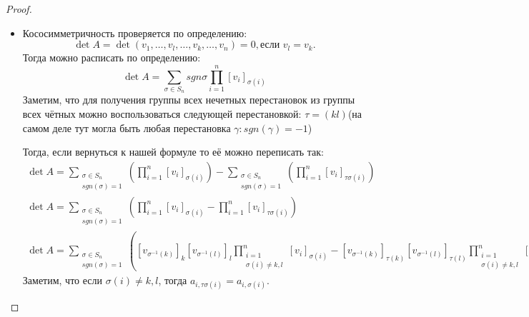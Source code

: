 \begin{proof}
\begin{enumerate}
\begin{itemize}
                \item Кососимметричность проверяется по определению:
                    \[
                    \det A = \det(v_1,\dots, v_l,\dots, v_k,\dots, v_n) = 0, \text{если } v_l = v_k.
                    \]
                    Тогда можно расписать по определению:
                    \[
                        \det A = \sum\limits_{\sigma\in S_n}^{}{sgn\sigma\prod\limits_{i=1}^{n}[v_i]_{\sigma(i)}}
                    \]
                    Заметим, что для получения группы всех нечетных перестановок из группы всех 
                    чётных можно воспользоваться следующей перестановкой: $\tau=(kl)$(на самом
                    деле тут могла быть любая перестановка $\gamma\colon sgn(\gamma) = -1$)

                    Тогда, если вернуться к нашей формуле то её можно переписать так:
                    \[
                    \begin{gathered}
                        \det A = 
                        \sum\limits_{\substack{\sigma\in S_n\\sgn(\sigma)=1}}
                        \left(\prod\limits_{i=1}^{n}[v_i]_{\sigma(i)}\right)
                            - 
                        \sum\limits_{\substack{\sigma\in S_n\\sgn(\sigma)=1}}
                        \left(\prod\limits_{i=1}^{n}[v_i]_{\tau\sigma(i)}\right)
                        \\
                        \det A = 
                        \sum\limits_{\substack{\sigma\in S_n\\sgn(\sigma)=1}}
                        \left(\prod\limits_{i=1}^{n}[v_i]_{\sigma(i)}- \prod\limits_{i=1}^{n}[v_i]_{\tau\sigma(i)}\right)
                        \\
                        \det A = 
                        \sum\limits_{\substack{\sigma\in S_n\\sgn(\sigma)=1}}
                        \left([v_{\sigma^{-1}(k)}]_k [v_{\sigma^{-1}(l)}]_l \prod\limits_{\substack{i=1\\\sigma(i)\not=k,l}}^{n}[v_i]_{\sigma(i)}-
                        [v_{\sigma^{-1}(k)}]_{\tau(k)} [v_{\sigma^{-1}(l)}]_{\tau(l)} \prod\limits_{\substack{i=1\\\sigma(i)\not=k,l}}^{n}[v_i]_{\tau\sigma(i)}\right)
                    \end{gathered}
                    \]
                    Заметим, что если $\sigma(i)\not= k,l$, тогда $a_{i, \tau\sigma(i)} = a_{i,\sigma(i)}$.

\end{itemize}
\end{enumerate}
\end{proof}
